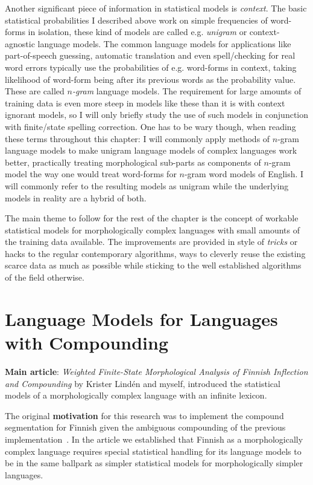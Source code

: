 \documentclass[officiallayout]{unihelcompling}
\begin{document}
Another significant piece of information in statistical models is
\emph{context}. The basic statistical probabilities I described above work on
simple frequencies of word-forms in isolation, these kind of models are called
e.g. \emph{unigram} or context-agnostic language models. The common language
models for applications like part-of-speech guessing, automatic translation and
even spell\-/checking for real word errors typically use the probabilities of
e.g.  word-forms in context, taking likelihood of word-form being after its
previous words as the probability value. These are called \emph{\(n\)-gram}
language models.  The requirement for large amounts of training data is even
more steep in models like these than it is with context ignorant models, so I
will only briefly study the use of such models in conjunction with finite\-/state
spelling correction. One has to be wary though, when reading these terms
throughout this chapter: I will commonly apply methods of \(n\)-gram language
models to make unigram language models of complex languages work better,
practically treating morphological sub-parts as components of \(n\)-gram model the
way one would treat word-forms for \(n\)-gram word models of English. I will
commonly refer to the resulting models as unigram while the underlying models
in reality are a hybrid of both.

The main theme to follow for the rest of the chapter is the concept of workable
statistical models for morphologically complex languages with small amounts of
the training data available. The improvements are provided in style of
\emph{tricks} or hacks to the regular contemporary algorithms, ways to cleverly
reuse the existing scarce data as much as possible while sticking to the well
established algorithms of the field otherwise.

\section{Language Models for Languages with Compounding}
\label{sec:compounding}

\textbf{Main article}: \emph{Weighted Finite-State Morphological Analysis of
Finnish Inflection and Compounding}  by Krister
Lindén and myself, introduced the statistical models of a morphologically
complex language with an infinite lexicon.

The original \textbf{motivation} for this research was to implement the
compound segmentation for Finnish given the ambiguous compounding of the
previous implementation~\citep{pirinen2008suomen}. In the article we
established that Finnish as a morphologically complex language requires special
statistical handling for its language models to be in the same ballpark as
simpler statistical models for morphologically simpler languages.
\end{document}
